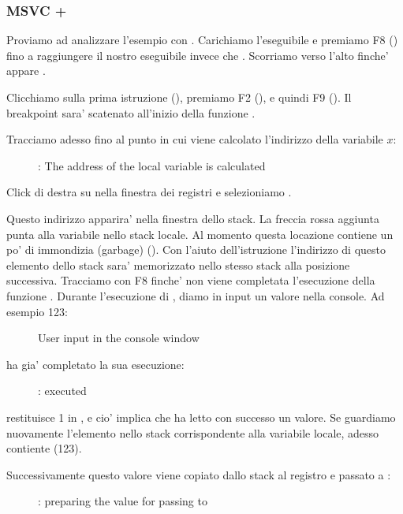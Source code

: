 \clearpage
\subsubsection{MSVC + \olly}
\myindex{\olly}

Proviamo ad analizzare l'esempio con \olly.
Carichiamo l'eseguibile e premiamo F8 (\stepover) fino a raggiungere il nostro eseguibile invece che .
Scorriamo verso l'alto finche' appare \main .

Clicchiamo sulla prima istruzione (), premiamo F2 (), e quindi F9 ().
Il breakpoint sara' scatenato all'inizio della funzione \main .

Tracciamo adesso fino al punto in cui viene calcolato l'indirizzo della variabile $x$:

\begin{figure}[H]
\centering
{}
\caption{\olly: The address of the local variable is calculated}
\label{fig:scanf_ex1_olly_1}
\end{figure}


Click di destra su \EAX nella finestra dei registri e selezioniamo .

Questo indirizzo apparira' nella finestra dello stack.
La freccia rossa aggiunta punta alla variabile nello stack locale.
Al momento questa locazione contiene un po' di immondizia (garbage) ().
Con l'aiuto dell'istruzione \PUSH l'indirizzo di questo elemento dello stack sara' memorizzato nello stesso stack alla posizione successiva.
Tracciamo con F8 finche' non viene completata l'esecuzione della funzione \scanf.
Durante l'esecuzione di \scanf, diamo in input un valore nella console. Ad esempio 123:

\begin{figure}[H]
\centering
{}
\caption{User input in the console window}
\label{fig:scanf_ex1_olly_2}
\end{figure}

\clearpage
\scanf ha gia' completato la sua esecuzione:

\begin{figure}[H]
\centering
{}
\caption{\olly: \scanf executed}
\label{fig:scanf_ex1_olly_3}
\end{figure}

\scanf restituisce 1 in \EAX, e cio' implica che ha letto con successo un valore.
Se guardiamo nuovamente l'elemento nello stack corrispondente alla variabile locale, adesso contiente  (123).

\clearpage

Successivamente questo valore viene copiato dallo stack al registro \ECX e passato a \printf:

\begin{figure}[H]
\centering
{}
\caption{\olly: preparing the value for passing to \printf}
\label{fig:scanf_ex1_olly_4}
\end{figure}
